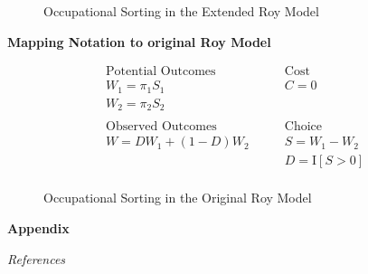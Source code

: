 \begin{frame}
\begin{figure}[htp]\centering
\caption{Occupational Sorting in the Extended Roy Model}\label{Occupational Sorting in the Extended Roy Model}
\end{figure}
\end{frame}




\begin{frame}
\textbf{Mapping Notation to original Roy Model}

\begin{align*}
\text{Potential Outcomes} &\qquad \text{Cost} \\
W_1 = \pi_1 S_1      &\qquad C = 0 \\
W_2 = \pi_2 S_2       &\qquad \\
    & \\
\text{Observed Outcomes } &\qquad \text{Choice} \\
W = D W_1 + (1 - D)W_2 &\qquad S = W_1 - W_2 \\
                       &\qquad D = \mathrm{I}[S > 0] \\
\end{align*}
\end{frame}

\begin{frame}
\begin{figure}[htp]\centering
\caption{Occupational Sorting in the Original Roy Model}\label{Occupational Sorting in the Original Roy Model}
\end{figure}
\end{frame}


\beginbackup\appendix
\begin{frame}\begin{center}
\LARGE\textbf{Appendix}
\end{center}\end{frame}

\begin{frame}\begin{center}
\LARGE\textit{References}
\end{center}\end{frame}
\begin{frame}[allowframebreaks]\frametitle{}

\nocite{Carneiro.2011, Heckman.1990c, Heckman.2010h}





\end{frame}

\backupend

